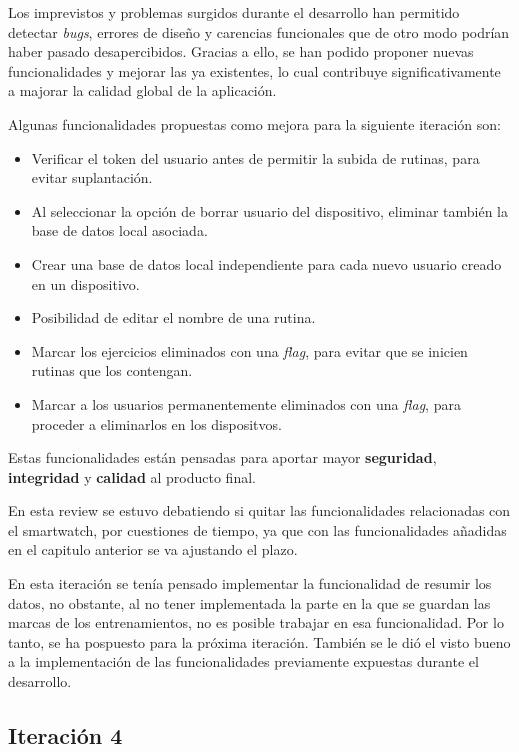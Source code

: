 Los imprevistos y problemas surgidos durante el desarrollo han permitido detectar \textit{bugs}, errores de diseño y carencias funcionales que de otro modo podrían haber pasado desapercibidos. Gracias a ello, se han podido proponer nuevas funcionalidades y mejorar las ya existentes, lo cual contribuye significativamente a majorar la calidad global de la aplicación.

Algunas funcionalidades propuestas como mejora para la siguiente iteración son:

\begin{itemize}
  \item Verificar el token del usuario antes de permitir la subida de rutinas, para evitar suplantación.
  \item Al seleccionar la opción de borrar usuario del dispositivo, eliminar también la base de datos local asociada.
  \item Crear una base de datos local independiente para cada nuevo usuario creado en un dispositivo.
  \item Posibilidad de editar el nombre de una rutina.
  \item Marcar los ejercicios eliminados con una \textit{flag}, para evitar que se inicien rutinas que los contengan.
  \item Marcar a los usuarios permanentemente eliminados con una \textit{flag}, para proceder a eliminarlos en los dispositvos.
\end{itemize}

Estas funcionalidades están pensadas para aportar mayor \textbf{seguridad}, \textbf{integridad} y \textbf{calidad} al producto final.

En esta review se estuvo debatiendo si quitar las funcionalidades relacionadas con el smartwatch, por cuestiones de tiempo, ya que con las funcionalidades añadidas en el capitulo anterior se va ajustando el plazo.

En esta iteración se tenía pensado implementar la funcionalidad de resumir los datos, no obstante, al no tener implementada la parte en la que se guardan las marcas de los entrenamientos, no es posible trabajar en esa funcionalidad. Por lo tanto, se ha pospuesto para la próxima iteración. También se le dió el visto bueno a la implementación de las funcionalidades previamente expuestas durante el desarrollo.

\subsection{Iteración 4}

